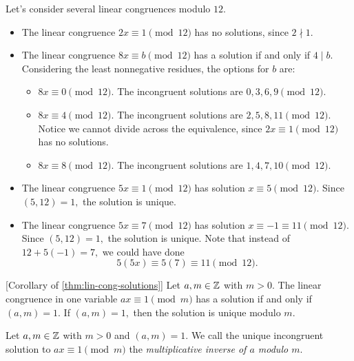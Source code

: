 \documentclass{ximera}
\begin{document}
\begin{example} 
	Let's consider several linear congruences modulo $12.$
	\begin{itemize}
		\item The linear congruence $2x\equiv 1\pmod{12}$ has no solutions, since $2\nmid1.$
		\item The linear congruence $8x\equiv b \pmod{12}$ has a solution if and only if $4\mid b$. Considering the least nonnegative residues, the options for $b$ are:
			\begin{itemize}
			\item $8x\equiv 0\pmod{12}.$ The incongruent solutions are $0,3,6,9\pmod{12}.$
			\item $8x\equiv 4\pmod{12}.$ The incongruent solutions are $2,5,8,11\pmod{12}.$ Notice we cannot divide across the equivalence, since $2x\equiv 1\pmod{12}$ has no solutions. 
			\item $8x\equiv 8\pmod{12}.$ The incongruent solutions are $1,4,7,10\pmod{12}.$ 
			\end{itemize}
		\item The linear congruence $5x\equiv 1 \pmod{12}$ has solution $x\equiv 5\pmod{12}.$ Since $(5,12)=1,$ the solution is unique.
		\item The linear congruence $5x\equiv 7 \pmod{12}$ has solution $x\equiv -1\equiv 11\pmod{12}.$ Since $(5,12)=1,$ the solution is unique. Note that instead of $12+5(-1)=7,$ we could have done 
		\[5(5x)\equiv 5(7)\equiv 11\pmod{12}.\]
	\end{itemize}
\end{example}




\begin{corollary}\label{cor:condition-invertible}[Corollary of \cref{thm:lin-cong-solutions}]
    Let $a,m\in\mathbb Z$ with $m>0.$ The linear congruence in one variable $ax\equiv 1\pmod{m}$ has a solution if and only if $(a,m)=1$. If $(a,m)=1,$ then the solution is unique modulo $m$. 
\end{corollary}

\begin{defn}\label{defn:mult-inv} Let $a,m\in\mathbb Z$ with $m>0$ and $(a,m)=1.$
    We call the unique incongruent solution to $ax\equiv 1\pmod m$ the \emph{multiplicative inverse of $a$ modulo $m$}.
\end{defn}
\end{document}
